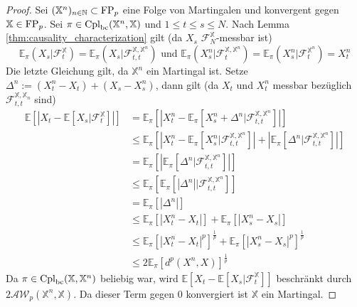 \begin{proof}
    Sei $(\mathbb{X}^n)_{n\in\mathbb{N}} \subset \operatorname{FP}_p$ eine Folge von Martingalen und konvergent gegen $\mathbb{X} \in \operatorname{FP}_p$. Sei $\pi \in \operatorname{Cpl}_{\operatorname{bc}}(\mathbb{X}^n, \mathbb{X})$ und $1\leq t\leq s \leq N$. 
    Nach Lemma \ref{thm:causality_characterization} gilt (da $X_s$ $\mathcal{F}_N^\mathbb{X}$-messbar ist)
    $$\mathbb{E}_\pi(X_s \vert \mathcal{F}_t^\mathbb{X}) = \mathbb{E}_\pi(X_s \vert \mathcal{F}_{t,t}^{\mathbb{X}, \mathbb{X}^n}) \text{ und } \mathbb{E}_\pi(X_s^n \vert \mathcal{F}_t^{\mathbb{X}, \mathbb{X}^n}) = \mathbb{E}_\pi(X_s^n \vert \mathcal{F}_t^{\mathbb{X}^n}) = X_t^n $$
    Die letzte Gleichung gilt, da $\mathbb{X}^n$ ein Martingal ist. Setze $\Delta^n := (X_t^n - X_t) + (X_s - X_s^n)$, dann gilt (da $X_t$ und $X_t^n$ messbar bezüglich $\mathcal{F}_{t,t}^{\mathbb{X}, \mathbb{X}_n}$ sind)
    \begin{align*}
        \mathbb{E}\left[ \left|X_t - \mathbb{E}[X_s \vert \mathcal{F}_t^\mathbb{X}] \right|\right] &= \mathbb{E}_\pi\left[\left|X_t^n - \mathbb{E}_\pi\left[ X_s^n+ \Delta^n \vert \mathcal{F}_{t,t}^{\mathbb{X}, \mathbb{X}^n}\right] \right| \right] \\
        &\leq \mathbb{E}_\pi\left[\left|X_t^n - \mathbb{E}_\pi\left[ X_s^n\vert \mathcal{F}_{t,t}^{\mathbb{X}, \mathbb{X}^n}\right] \right| + \left|\mathbb{E}_\pi\left[ \Delta^n \vert \mathcal{F}_{t,t}^{\mathbb{X}, \mathbb{X}^n}\right] \right|\right] \\
        &= \mathbb{E}_\pi\left[\left|\mathbb{E}_\pi\left[ \Delta^n \vert \mathcal{F}_{t,t}^{\mathbb{X}, \mathbb{X}^n}\right] \right| \right] \\
        &\leq \mathbb{E}_\pi \left[ \mathbb{E}_\pi \left[ \left| \Delta^n\right| \vert \mathcal{F}_{t,t}^{\mathbb{X}, \mathbb{X}^n}\right]\right] \\
        &= \mathbb{E}_\pi\left[ \left| \Delta^n\right| \right] \\
        &\leq \mathbb{E}_\pi\left[\left| X_t^n - X_t \right|\right] + \mathbb{E}_\pi\left[\left| X_s^n - X_s \right|\right] \\
        &\leq \mathbb{E}_\pi\left[|X_t^n - X_t|^p \right]^{\frac{1}{p}} + \mathbb{E}_\pi\left[|X_s^n - X_s|^p \right]^{\frac{1}{p}} \\
        &\leq 2\mathbb{E}_\pi \left[ d^p(X^n, X) \right]^\frac{1}{p}
    \end{align*}
    Da $\pi \in \operatorname{Cpl}_{\operatorname{bc}}(\mathbb{X}, \mathbb{X}^n)$ beliebig war, wird $\mathbb{E}\left[X_t - \mathbb{E}[X_s \vert \mathcal{F}_t^\mathbb{X}] \right]$ beschränkt durch \\ $2\mathcal{AW}_p(\mathbb{X}^n, \mathbb{X})$. Da dieser Term gegen $0$ konvergiert ist $\mathbb{X}$ ein Martingal. 
\end{proof}
